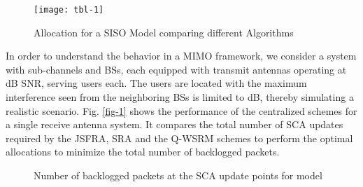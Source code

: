 \begin{figure}
\centering
\texttt{[image: tbl-1]}
\caption{Allocation for a \ac{SISO} Model comparing different Algorithms}
\label{tbl-1}
\end{figure}

In order to understand the behavior in a \ac{MIMO} framework, we consider a system with  sub-channels and  \acp{BS}, each equipped with  transmit antennas operating at dB \ac{SNR}, serving  users each. The users are located with the maximum interference seen from the neighboring \acp{BS} is limited to  dB, thereby simulating a realistic scenario. Fig. \ref{fig-1} shows the performance of the centralized schemes for a single receive antenna system. It compares the total number of \ac{SCA} updates required by the \ac{JSFRA}, \ac{SRA} and the \ac{Q-WSRM} schemes to perform the optimal allocations to minimize the total number of backlogged packets.
\begin{figure*}
\centering
{}
\hfill
{}
\caption{Number of backlogged packets at the \ac{SCA} update points for  model}
\label{fig-a}
\end{figure*}

